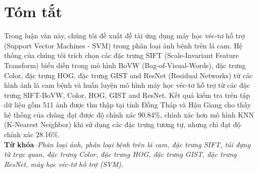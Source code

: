 \chapter*{\Huge Tóm tắt}
Trong luận văn này, chúng tôi đề xuất đề tài ứng dụng máy học véc-tơ hỗ trợ (Support Vector Machines - SVM) trong phân loại ảnh bệnh trên lá cam. Hệ thống của chúng tôi trích chọn các đặc trưng SIFT (Scale-Invariant Feature Transform) biểu diễn trong mô hình BoVW (Bag-of-Visual-Words), đặc trưng Color, đặc trưng HOG, đặc trưng GIST and ResNet (Residual Networks) từ các hình ảnh lá cam bệnh và huấn luyện mô hình máy học véc-tơ hỗ trợ từ các đặc trưng SIFT-BoVW, Color, HOG, GIST and ResNet. Kết quả kiểm tra trên tập dữ liệu gồm 511 ảnh được thu thập tại tỉnh Đồng Tháp và Hậu Giang cho thấy hệ thống của chúng đạt được độ chính xác 90.84\%, chính xác hơn mô hình KNN (K-Nearest Neighbor) khi sử dụng các đặc trưng tương tự, nhưng chỉ đạt độ chính xác 28.16\%.\\

\noindent \textbf{Từ khóa}--\emph{Phân loại ảnh, phân loại bệnh trên lá cam, đặc trưng SIFT, túi đựng từ trực quan, đặc trưng Color, đặc trưng HOG, đặc trưng GIST, đặc trưng ResNet, máy học véc-tơ hỗ trợ (SVM).}